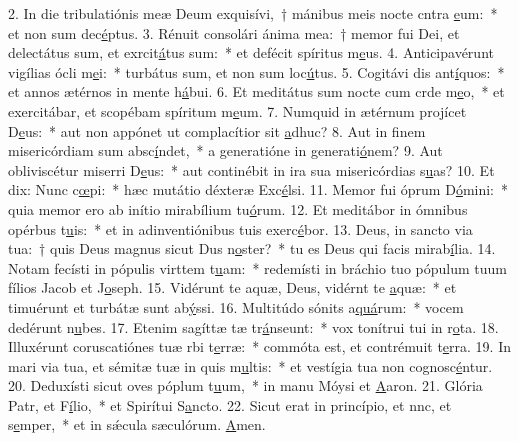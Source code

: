 2. In die tribulatiónis meæ Deum exquisívi,~† mánibus meis nocte cntra \uline{e}um:~* et non sum dec\uline{é}ptus.
3. Rénuit consolári ánima mea:~† memor fui Dei, et delectátus sum, et exrcit\uline{á}tus sum:~* et defécit spíritus m\uline{e}us.
4. Anticipavérunt vigílias ócli m\uline{e}i:~* turbátus sum, et non sum loc\uline{ú}tus.
5. Cogitávi dis ant\uline{í}quos:~* et annos ætérnos in mente h\uline{á}bui.
6. Et meditátus sum nocte cum crde m\uline{e}o,~* et exercitábar, et scopébam spíritum m\uline{e}um.
7. Numquid in ætérnum projícet D\uline{e}us:~* aut non appónet ut complacítior sit \uline{a}dhuc?
8. Aut in finem misericórdiam sum absc\uline{í}ndet,~* a generatióne in generati\uline{ó}nem?
9. Aut obliviscétur miserri D\uline{e}us:~* aut continébit in ira sua misericórdias s\uline{u}as?
10. Et dix: Nunc c\uline{œ}pi:~* hæc mutátio déxteræ Exc\uline{é}lsi.
11. Memor fui óprum D\uline{ó}mini:~* quia memor ero ab inítio mirabílium tu\uline{ó}rum.
12. Et meditábor in ómnibus opérbus t\uline{u}is:~* et in adinventiónibus tuis exerc\uline{é}bor.
13. Deus, in sancto via tua:~† quis Deus magnus sicut Dus n\uline{o}ster?~* tu es Deus qui facis mirab\uline{í}lia.
14. Notam fecísti in pópulis virttem t\uline{u}am:~* redemísti in bráchio tuo pópulum tuum fílios Jacob et J\uline{o}seph.
15. Vidérunt te aquæ, Deus, vidérnt te \uline{a}quæ:~* et timuérunt et turbátæ sunt ab\uline{ý}ssi.
16. Multitúdo sónits a\uline{quá}rum:~* vocem dedérunt n\uline{u}bes.
17. Etenim sagíttæ tæ tr\uline{á}nseunt:~* vox tonítrui tui in r\uline{o}ta.
18. Illuxérunt coruscatiónes tuæ rbi t\uline{e}rræ:~* commóta est, et contrémuit t\uline{e}rra.
19. In mari via tua, et sémitæ tuæ in quis m\uline{u}ltis:~* et vestígia tua non cognosc\uline{é}ntur.
20. Deduxísti sicut oves póplum t\uline{u}um,~* in manu Móysi et \uline{A}aron.
21. Glória Patr, et F\uline{í}lio,~* et Spirítui S\uline{a}ncto.
22. Sicut erat in princípio, et nnc, et s\uline{e}mper,~* et in sǽcula sæculórum. \uline{A}men.
